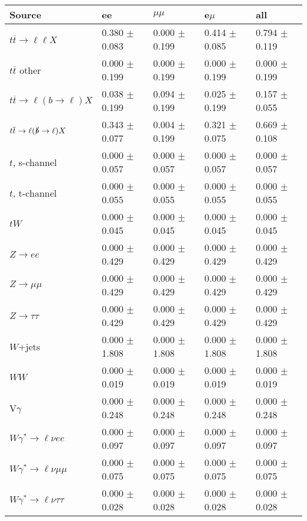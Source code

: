 \begin{tabular}{l | l l l l}
\hline\hline
 Source  &  ee  &  $\mu\mu$  &  e$\mu$  &  all \\
\hline
$t\overline{t}\rightarrow \ell\ell X$ &  0.380 $\pm$  0.083 &  0.000 $\pm$  0.199 &  0.414 $\pm$  0.085 &  0.794 $\pm$  0.119\\
$t\overline{t}$ other &  0.000 $\pm$  0.199 &  0.000 $\pm$  0.199 &  0.000 $\pm$  0.199 &  0.000 $\pm$  0.199\\
$t\overline{t}\rightarrow \ell(b\rightarrow \ell)X$ &  0.038 $\pm$  0.199 &  0.094 $\pm$  0.199 &  0.025 $\pm$  0.199 &  0.157 $\pm$  0.055\\
$t\overline{t}\rightarrow \ell(\slashed{b}\rightarrow \ell)X$ &  0.343 $\pm$  0.077 &  0.004 $\pm$  0.199 &  0.321 $\pm$  0.075 &  0.669 $\pm$  0.108\\
\hline
$t$, s-channel &  0.000 $\pm$  0.057 &  0.000 $\pm$  0.057 &  0.000 $\pm$  0.057 &  0.000 $\pm$  0.057\\
$t$, t-channel &  0.000 $\pm$  0.055 &  0.000 $\pm$  0.055 &  0.000 $\pm$  0.055 &  0.000 $\pm$  0.055\\
$tW$ &  0.000 $\pm$  0.045 &  0.000 $\pm$  0.045 &  0.000 $\pm$  0.045 &  0.000 $\pm$  0.045\\
\hline
$Z\rightarrow ee$ &  0.000 $\pm$  0.429 &  0.000 $\pm$  0.429 &  0.000 $\pm$  0.429 &  0.000 $\pm$  0.429\\
$Z\rightarrow\mu\mu$ &  0.000 $\pm$  0.429 &  0.000 $\pm$  0.429 &  0.000 $\pm$  0.429 &  0.000 $\pm$  0.429\\
$Z\rightarrow\tau\tau$ &  0.000 $\pm$  0.429 &  0.000 $\pm$  0.429 &  0.000 $\pm$  0.429 &  0.000 $\pm$  0.429\\
$W$+jets &  0.000 $\pm$  1.808 &  0.000 $\pm$  1.808 &  0.000 $\pm$  1.808 &  0.000 $\pm$  1.808\\
$WW$ &  0.000 $\pm$  0.019 &  0.000 $\pm$  0.019 &  0.000 $\pm$  0.019 &  0.000 $\pm$  0.019\\
\hline
V$\gamma$ &  0.000 $\pm$  0.248 &  0.000 $\pm$  0.248 &  0.000 $\pm$  0.248 &  0.000 $\pm$  0.248\\
$W\gamma^{*}\rightarrow\ell\nu e e$ &  0.000 $\pm$  0.097 &  0.000 $\pm$  0.097 &  0.000 $\pm$  0.097 &  0.000 $\pm$  0.097\\
$W\gamma^{*}\rightarrow\ell\nu\mu\mu$ &  0.000 $\pm$  0.075 &  0.000 $\pm$  0.075 &  0.000 $\pm$  0.075 &  0.000 $\pm$  0.075\\
$W\gamma^{*}\rightarrow\ell\nu\tau\tau$ &  0.000 $\pm$  0.028 &  0.000 $\pm$  0.028 &  0.000 $\pm$  0.028 &  0.000 $\pm$  0.028\\

\end{tabular}
